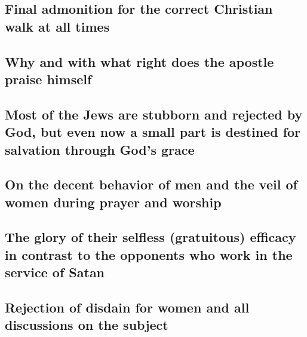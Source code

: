 \hypertarget{final-admonition-for-the-correct-christian-walk-at-all-times}{%
\subsection{Final admonition for the correct Christian walk at all
times}\label{final-admonition-for-the-correct-christian-walk-at-all-times}}

\hypertarget{why-and-with-what-right-does-the-apostle-praise-himself}{%
\subsection{Why and with what right does the apostle praise
himself}\label{why-and-with-what-right-does-the-apostle-praise-himself}}

\hypertarget{most-of-the-jews-are-stubborn-and-rejected-by-god-but-even-now-a-small-part-is-destined-for-salvation-through-gods-grace}{%
\subsection{Most of the Jews are stubborn and rejected by God, but even
now a small part is destined for salvation through God's
grace}\label{most-of-the-jews-are-stubborn-and-rejected-by-god-but-even-now-a-small-part-is-destined-for-salvation-through-gods-grace}}

\hypertarget{on-the-decent-behavior-of-men-and-the-veil-of-women-during-prayer-and-worship}{%
\subsection{On the decent behavior of men and the veil of women during
prayer and
worship}\label{on-the-decent-behavior-of-men-and-the-veil-of-women-during-prayer-and-worship}}

\hypertarget{the-glory-of-their-selfless-gratuitous-efficacy-in-contrast-to-the-opponents-who-work-in-the-service-of-satan}{%
\subsection{The glory of their selfless (gratuitous) efficacy in
contrast to the opponents who work in the service of
Satan}\label{the-glory-of-their-selfless-gratuitous-efficacy-in-contrast-to-the-opponents-who-work-in-the-service-of-satan}}

\hypertarget{rejection-of-disdain-for-women-and-all-discussions-on-the-subject}{%
\subsection{Rejection of disdain for women and all discussions on the
subject}\label{rejection-of-disdain-for-women-and-all-discussions-on-the-subject}}

